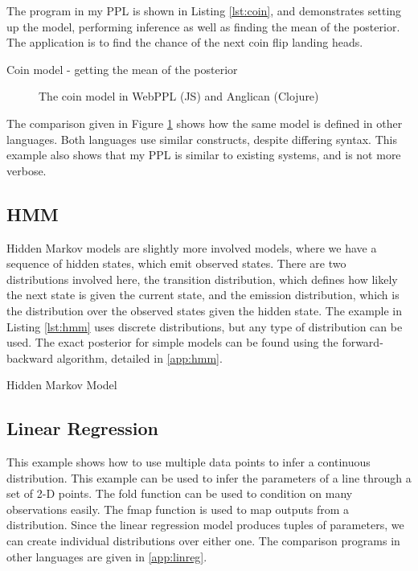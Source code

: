 The program in my PPL is shown in Listing \ref{lst:coin}, and demonstrates setting up the model, performing inference as well as finding the mean of the posterior. The application is to find the chance of the next coin flip landing heads.

\begin{listing}[!ht]
	\caption{Coin model - getting the mean of the posterior}
	\label{lst:coin}
\end{listing}


\begin{figure}[!htb]
	\begin{minipage}{0.5\textwidth}
		\centering
	\end{minipage}
	\begin{minipage}{0.5\textwidth}
		\centering
	\end{minipage}
	\caption{The coin model in WebPPL (JS) and Anglican (Clojure)}
	\label{fig:compare-coin}
\end{figure}

The comparison given in Figure \ref{fig:compare-coin} shows how the same model is defined in other languages. Both languages use similar constructs, despite differing syntax. This example also shows that my PPL is similar to existing systems, and is not more verbose.

\subsection{HMM}
Hidden Markov models are slightly more involved models, where we have a sequence of hidden states, which emit observed states. There are two distributions involved here, the transition distribution, which defines how likely the next state is given the current state, and the emission distribution, which is the distribution over the observed states given the hidden state. The example in Listing \ref{lst:hmm} uses discrete distributions, but any type of distribution can be used. The exact posterior for simple models can be found using the forward-backward algorithm, detailed in \ref{app:hmm}.
\begin{listing}[!ht]
	\caption{Hidden Markov Model}
	\label{lst:hmm}
\end{listing}

\subsection{Linear Regression}
This example shows how to use multiple data points to infer a continuous distribution. This example can be used to infer the parameters of a line through a set of 2-D points. The fold function can be used to condition on many observations easily. The fmap function is used to map outputs from a distribution. Since the linear regression model produces tuples of parameters, we can create individual distributions over either one. The comparison programs in other languages are given in \ref{app:linreg}.

